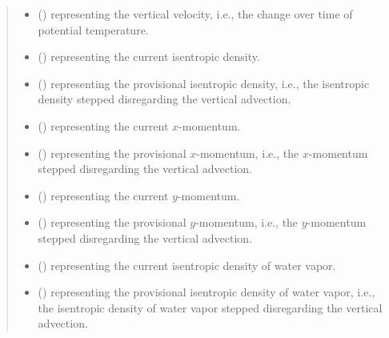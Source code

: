 \documentclass[letterpaper,10pt,english]{sphinxmanual}
\begin{document}
\begin{fulllineitems}
\begin{fulllineitems}
\begin{quote}
\begin{description}
\begin{itemize}
\item {} 
 () \textendash{}  representing the vertical velocity,
i.e., the change over time of potential temperature.

\item {} 
 () \textendash{}  representing the current isentropic density.

\item {} 
 () \textendash{}  representing the provisional isentropic density,
i.e., the isentropic density stepped disregarding the vertical advection.

\item {} 
 () \textendash{}  representing the current \(x\)-momentum.

\item {} 
 () \textendash{}  representing the provisional \(x\)-momentum,
i.e., the \(x\)-momentum stepped disregarding the vertical advection.

\item {} 
 () \textendash{}  representing the current \(y\)-momentum.

\item {} 
 () \textendash{}  representing the provisional \(y\)-momentum,
i.e., the \(y\)-momentum stepped disregarding the vertical advection.

\item {} 
 () \textendash{}  representing the current isentropic density of water vapor.

\item {} 
 () \textendash{}  representing the provisional isentropic density of water vapor,
i.e., the isentropic density of water vapor stepped disregarding the vertical advection.


\end{itemize}
\end{description}
\end{quote}
\end{fulllineitems}
\end{fulllineitems}
\end{document}
